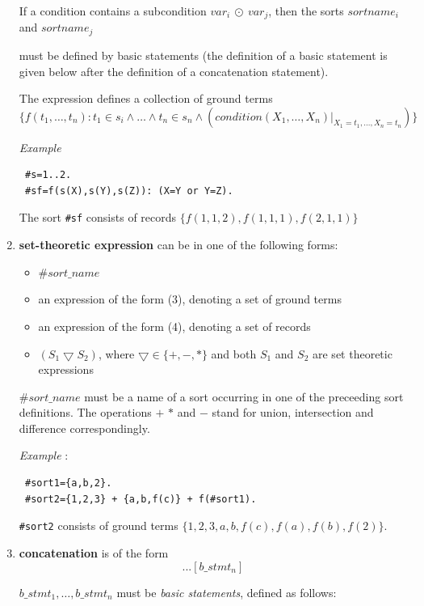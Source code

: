 \documentclass[12pt, letterpaper]{article}
\begin{document}
\begin{enumerate}
If a condition contains a subcondition $var_i~\odot~var_j$,  then the sorts  $sortname_i$ and  $sortname_j$

must be defined by basic statements (the definition of a basic statement is given below after the definition of a concatenation statement).

The expression defines a collection of ground terms 
\\ $\{f(t_1,\dots,t_n):  t_1 \in s_i \land \dots \land t_n \in s_n \land (condition(X_1,\dots, X_n)|_{X_1 = t_1,\dots,X_n = t_n})\}$

\textit{Example}
\begin{verbatim}
 #s=1..2.
 #sf=f(s(X),s(Y),s(Z)): (X=Y or Y=Z). 
\end{verbatim}

The sort \texttt{\#sf} consists of records $\{f(1,1,2),f(1,1,1),f(2,1,1)\}$



 \item \textbf{set-theoretic expression} can be in one of the following forms:
\begin{itemize}
\item $\#sort\_name$  
\item an expression of the form (3), denoting a set of ground terms
\item an expression of the form (4), denoting a set of records
\item $(S_1 \bigtriangledown S_2)$, where $\bigtriangledown \in \{+,-,*\}$ and both $S_1$ and $S_2$ are set theoretic expressions
\end{itemize}

$\#sort\_name$ must be a name of a sort occurring in one of the preceeding sort definitions. 
The operations $+$ $*$ and $-$ stand for union, intersection and difference correspondingly.


\textit{Example} : 
\begin{verbatim}
 #sort1={a,b,2}.
 #sort2={1,2,3} + {a,b,f(c)} + f(#sort1).
\end{verbatim}
 \texttt{\#sort2} consists of ground terms $\{1,2,3,a,b,f(c),f(a),f(b),f(2)\}$.
\item \textbf{concatenation} is of the form
\begin{equation*}
 [b\_stmt_1] ... [b\_stmt_n]
\end{equation*}

$b\_stmt_1, \dots, b\_stmt_n$ must be \textit{basic statements}, defined as follows:



\end{enumerate}
\end{document}
